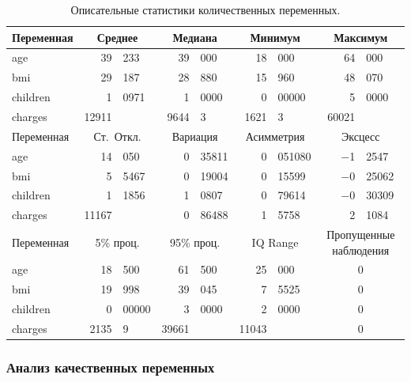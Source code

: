 \documentclass[a4paper,12pt]{article}
\begin{document}
\begin{table}[H]
\begin{center}
	\begin{tabular}{|lr@{,}lr@{,}lr@{,}lr@{,}l|}
		\hline
		Переменная & \multicolumn{2}{c}{Среднее}
		& \multicolumn{2}{c}{Медиана}
		& \multicolumn{2}{c}{Минимум}
		& \multicolumn{2}{c|}{Максимум} \\[1ex]
		\hline
		age & 39&233 & 39&000 & 18&000 & 64&000\\
		bmi & 29&187 & 28&880 & 15&960 & 48&070\\
		children & 1&0971 & 1&0000 & 0&00000 & 5&0000\\
		charges & 12911& & 9644&3 & 1621&3 & 60021&\\[10pt]
		
		\hline
		Переменная &  \multicolumn{2}{c}{Ст.\ Откл.}
		& \multicolumn{2}{c}{Вариация}
		& \multicolumn{2}{c}{Асимметрия}
		& \multicolumn{2}{c|}{Эксцесс} \\[1ex]
		\hline
		age & 14&050 & 0&35811 & 0&051080 & $-$1&2547\\
		bmi & 5&5467 & 0&19004 & 0&15599 & $-$0&25062\\
		children & 1&1856 & 1&0807 & 0&79614 & $-$0&30309\\
		charges & 11167& & 0&86488 & 1&5758 & 2&1084\\[10pt]
		
		\hline
		Переменная &  \multicolumn{2}{c}{5\% проц.}
		& \multicolumn{2}{c}{95\% проц.}
		& \multicolumn{2}{c}{IQ Range}
		& \multicolumn{2}{c|}{Пропущенные наблюдения} \\[1ex]
		\hline
		age & 18&500 & 61&500 & 25&000 & \multicolumn{2}{c|}{0}\\
		bmi & 19&998 & 39&045 & 7&5525 & \multicolumn{2}{c|}{0}\\
		children & 0&00000 & 3&0000 & 2&0000 & \multicolumn{2}{c|}{0}\\
		charges & 2135&9 & 39661& & 11043& & \multicolumn{2}{c|}{0}\\
		\hline
	\end{tabular}
\end{center}
\caption{Описательные статистики количественных переменных.}
\label{tab:table2}
\end{table}

\subsubsection{Анализ качественных переменных}
\end{document}
